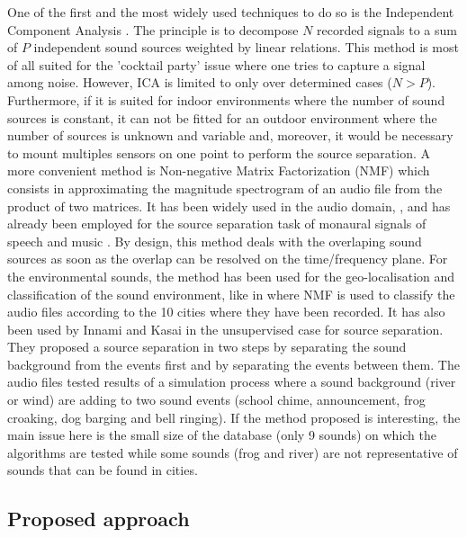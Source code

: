 \documentclass[twocolumn,a4paper,10pt]{article}
\begin{document}
One of the first and the most widely used techniques to do so is the Independent Component Analysis \cite{comon_independent_1994}. The principle is to decompose $N$ recorded signals to a sum of $P$ independent sound sources weighted by linear relations. This method is most of all suited for the 'cocktail party' issue where one tries to capture a signal among noise.  However, ICA is limited to only over determined cases ($N > P$). Furthermore, if it is suited for indoor environments where the number of sound sources is constant, it can not be fitted for an outdoor environment where the number of sources is unknown and variable and, moreover, it would be necessary to mount multiples sensors on one point to perform the source separation. A more convenient method is Non-negative Matrix Factorization (NMF) \cite{lee_learning_1999} which consists in approximating the magnitude spectrogram of an audio file from the product of two matrices. It has been widely used in the audio domain, \cite{smaragdis_non-negative_2003} \cite{wilson_speech_2008} \cite{mesaros_sound_2015}, and has already been employed for the source separation task of monaural signals of speech and music \cite{wang_musical_2005} \cite{wilson_speech_2008}. By design, this method deals with the overlaping sound sources as soon as the overlap can be resolved on the time/frequency plane. For the environmental sounds, the method has been used for the geo-localisation and classification of the sound environment, like in \cite{kumar_audio_2016} where NMF is used to classify the audio files according to the 10 cities where they have been recorded. It has also been used by Innami and Kasai in the unsupervised case \cite{satoshi_innami_nmf-based_2012} for source separation. They proposed a source separation in two steps by separating the sound background from the events first and by separating the events between them. The audio files tested results of a simulation process where a sound background (river or wind) are adding to two sound events (school chime, announcement, frog croaking, dog barging and bell ringing). If the method proposed is interesting, the main issue here is the small size of the database (only 9 sounds) on which the algorithms are tested while some sounds (frog and river) are not representative of sounds that can be found in cities.


\subsection{Proposed approach}
\end{document}
